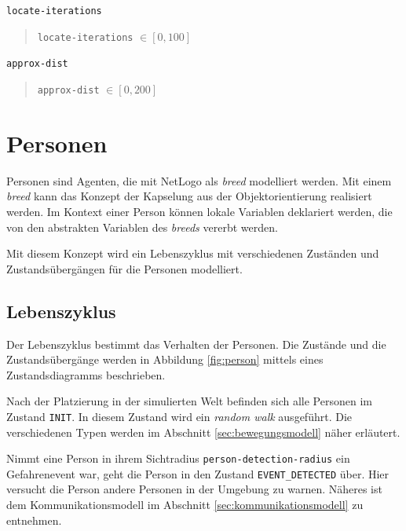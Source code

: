 \verb|locate-iterations|

\begin{quote}
\verb|locate-iterations| $\in [0, 100]$
\end{quote}

\verb|approx-dist|

\begin{quote}
\verb|approx-dist| $\in [0, 200]$
\end{quote}






\section{Personen}
\label{sec:personen}

Personen sind Agenten, die mit NetLogo als \emph{breed} modelliert werden. Mit einem \emph{breed} kann das Konzept der Kapselung aus der Objektorientierung realisiert werden. Im Kontext einer Person können lokale Variablen deklariert werden, die von den abstrakten Variablen des \emph{breeds} vererbt werden. 

Mit diesem Konzept wird ein Lebenszyklus mit verschiedenen Zuständen und Zustandsübergängen für die Personen modelliert. 

\subsection{Lebenszyklus}

Der Lebenszyklus bestimmt das Verhalten der Personen. Die Zustände und die Zustandsübergänge werden in Abbildung \ref{fig:person} mittels eines Zustandsdiagramms beschrieben. 

Nach der Platzierung in der simulierten Welt befinden sich alle Personen im Zustand \verb|INIT|. In diesem Zustand wird ein \emph{random walk} ausgeführt. Die verschiedenen Typen werden im Abschnitt \ref{sec:bewegungsmodell} näher erläutert.

Nimmt eine Person in ihrem Sichtradius \verb|person-detection-radius| ein Gefahrenevent war, geht die Person in den Zustand \verb|EVENT_DETECTED| über. Hier versucht die Person andere Personen in der Umgebung zu warnen. Näheres ist dem Kommunikationsmodell im Abschnitt \ref{sec:kommunikationsmodell} zu entnehmen.

